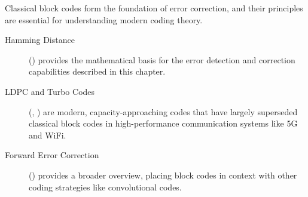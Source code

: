 \begin{importantbox}[title={Further Reading}]
    Classical block codes form the foundation of error correction, and their principles are essential for understanding modern coding theory.
    \begin{description}
        \item[Hamming Distance] () provides the mathematical basis for the error detection and correction capabilities described in this chapter.
        \item[LDPC and Turbo Codes] (, ) are modern, capacity-approaching codes that have largely superseded classical block codes in high-performance communication systems like 5G and WiFi.
        \item[Forward Error Correction] () provides a broader overview, placing block codes in context with other coding strategies like convolutional codes.
    \end{description}
\end{importantbox}
